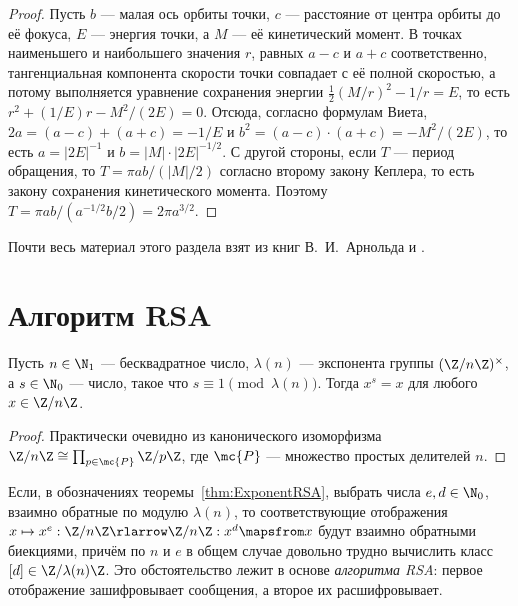 \documentclass[
	extrafontsizes,
	11pt,
	hyphens,
]{memoir}
\begin{document}
\begin{proof}
Пусть \(b\) --- малая ось орбиты точки, \(c\) --- расстояние от центра орбиты до её фокуса,
\(E\) --- энергия точки, а \(M\) --- её кинетический момент.
В точках наименьшего и наибольшего значения \(r\), равных \(a - c\) и \(a + c\) соответственно, тангенциальная компонента скорости точки совпадает с её полной скоростью, а потому выполняется уравнение сохранения энергии
\(\frac{1}{2} (M / r)^2 - 1 / r = E\),
то есть
\(r^2 + (1/E)r - M^2/(2E) = 0\).
Отсюда, согласно формулам Виета,
\(2a = (a - c) + (a + c) = - 1/E\)
и
\(b^2 = (a - c) \cdot (a + c) = - M^2 / (2E)\),
то есть \(a = \lvert 2 E \rvert^{-1}\) и \(b = \lvert M \rvert \cdot \lvert 2 E \rvert^{-1/2}\).
С другой стороны, если \(T\) --- период обращения, то \(T = \pi a b / (\lvert M \rvert / 2)\) согласно второму закону Кеплера, то есть закону сохранения кинетического момента.
Поэтому \(T = \pi a b / (a^{-1/2} b / 2) = 2 \pi a^{3/2}\).
\end{proof}

\begin{remark}
Почти весь материал этого раздела взят из книг В.~И.~Арнольда \cite[42]{arnold_mmkm} и \cite[29]{arnold_ponimanie}.
\end{remark}


\section{Алгоритм RSA}

\begin{theorem}
Пусть \(n \in \N_1\) --- бесквадратное число,
\(\lambda(n)\) --- экспонента группы \((\Z / n\Z)^{\times}\),
а \(s \in \N_0\) --- число, такое что \(s \equiv 1 \pmod{\lambda(n)}\).%
\label{thm:ExponentRSA}
Тогда \(x^s = x\) для любого \(x \in \Z / n\Z\).
\end{theorem}

\begin{proof}
Практически очевидно из канонического изоморфизма
\(\Z / n\Z \cong \prod_{p \in \mc{P}} \Z / p\Z\),
где \(\mc{P}\) --- множество простых делителей \(n\).
\end{proof}

\begin{remark}
Если, в обозначениях теоремы~\ref{thm:ExponentRSA}, выбрать числа \(e, d \in \N_0\),
взаимно обратные по модулю \(\lambda(n)\),
то соответствующие отображения
\(x \mapsto x^e : \Z / n\Z \rlarrow \Z / n\Z : x^d \mapsfrom x\)
будут взаимно обратными биекциями,
причём по \(n\) и \(e\) в общем случае довольно трудно вычислить класс \([d] \in \Z / \lambda(n) \Z\).
Это обстоятельство лежит в основе \emph{алгоритма RSA}:
первое отображение зашифровывает сообщения, а второе их расшифровывает.
\end{remark}
\end{document}
